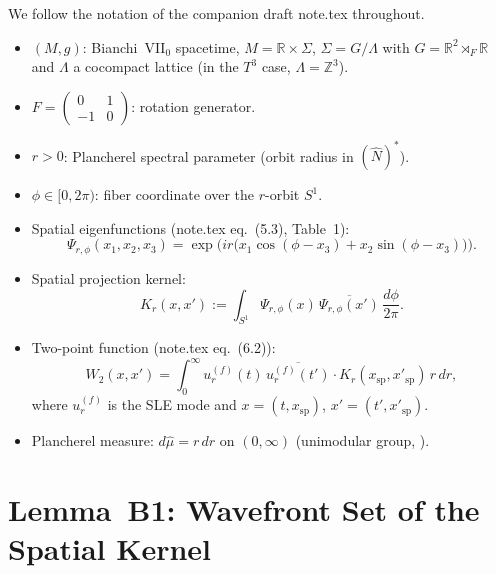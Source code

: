 \documentclass[12pt, a4paper]{article}
\theoremstyle{remark}
\newcommand{\bR}{\mathbb{R}}
\newcommand{\bZ}{\mathbb{Z}}
\newcommand{\semidp}{\rtimes}
\begin{document}
We follow the notation of the companion draft note.tex throughout.
\begin{itemize}
\item $(M, g)$: Bianchi~VII$_0$ spacetime, $M = \bR \times \Sigma$,
  $\Sigma = G/\Lambda$ with $G = \bR^2 \semidp_F \bR$ and $\Lambda$
  a cocompact lattice (in the $T^3$ case, $\Lambda = \bZ^3$).
\item $F = \begin{pmatrix}0&1\\{-1}&0\end{pmatrix}$: rotation generator.
\item $r > 0$: Plancherel spectral parameter (orbit radius in $(\hat{N})^*$).
\item $\phi \in [0,2\pi)$: fiber coordinate over the $r$-orbit $S^1$.
\item Spatial eigenfunctions (note.tex eq.~(5.3), \cite{AV13} Table~1):
  \begin{equation}\label{eq:eigenfunction}
    \Psi_{r,\phi}(x_1,x_2,x_3)
      = \exp\!\bigl(ir\bigl(x_1\cos(\phi - x_3)
                        + x_2\sin(\phi - x_3)\bigr)\bigr).
  \end{equation}
\item Spatial projection kernel:
  \begin{equation}\label{eq:Kr}
    K_r(x, x')
      := \int_{S^1} \Psi_{r,\phi}(x)\,\overline{\Psi_{r,\phi}(x')}
         \,\frac{d\phi}{2\pi}.
  \end{equation}
\item Two-point function (note.tex eq.~(6.2)):
  \begin{equation}\label{eq:W2}
    W_2(x,x') = \int_0^\infty u_r^{(f)}(t)\,\overline{u_r^{(f)}(t')}
      \cdot K_r(x_{\mathrm{sp}}, x'_{\mathrm{sp}})\,r\,dr,
  \end{equation}
  where $u_r^{(f)}$ is the SLE mode and $x = (t, x_{\mathrm{sp}})$,
  $x' = (t', x'_{\mathrm{sp}})$.
\item Plancherel measure: $d\hat\mu = r\,dr$ on $(0,\infty)$
  (unimodular group, \cite{AV13}).
\end{itemize}

\section{Lemma~B1: Wavefront Set of the Spatial Kernel}
\label{sec:LemmaB1}
\end{document}
